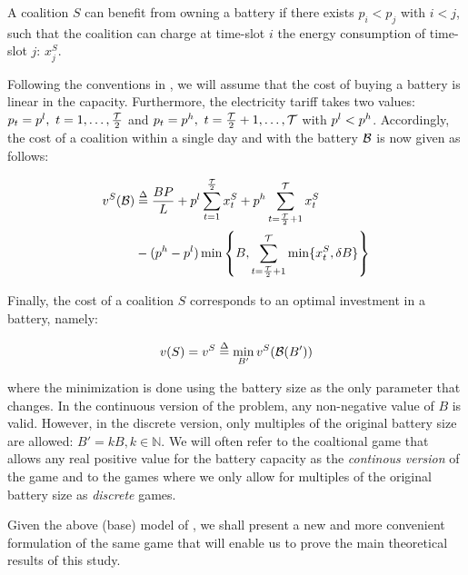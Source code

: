 A coalition $S$ can benefit from owning a battery if there exists $p_i < p_j$ with $i < j$, such that the coalition can charge at time-slot $i$ the energy consumption of time-slot $j$: $x^S_j$.

Following the conventions in \cite{kiedanskigames}, we will assume that the cost of buying a battery is linear in the capacity. Furthermore, the electricity tariff takes two values: $p_t = \pricelow, \ t=1, \dots, \frac{\mathcal{T}}{2}$ and $p_t = p^h, \ t=\frac{\mathcal{T}}{2} + 1, \dots, \mathcal{T}$ with $p^l < p^h$.
Accordingly, the cost of a coalition within a single day and with the battery $\mathcal{B}$ is now given as follows:

\begin{equation}
  \begin{aligned}
  \label{eq:cost_coal_bat}
  v^S(\Bat) &\overset{\Delta}{=} \frac{BP}{L} + p^l\sum_{t=1}^{\frac{\mathcal{T}}{2}} x^S_t
  + p^ h\sum_{t=\frac{\mathcal{T}}{2} + 1}^{\mathcal{{T}}} x^S_t \\
  &- (p^h -p^l)\min\left\{ B, \sum_{t=\frac{\mathcal{T}}{2} + 1}^{\mathcal{{T}}} \min\{x^S_t, \delta B\} \right\} \\
  \end{aligned}
\end{equation}


Finally, the cost of a coalition $S$ corresponds to an optimal investment in a battery, namely:

\begin{equation}
  \label{eq:cost_coal}
  v(S) = v^S \overset{\Delta}{=} \min_{B'} v^S(\Bat(B'))
\end{equation}

where the minimization is done using the battery size as the only parameter that changes. In the continuous version of the problem, any non-negative value of $B$ is valid. However, in the discrete version, only multiples of the original battery size are allowed: $B' = kB, k \in \mathbb{N}$. We will often refer to the coaltional game that allows any real positive value for the battery capacity as the \textit{continous version} of the game and to the games where we only allow for multiples of the original battery size as \textit{discrete} games.

Given the above (base) model of \cite{kiedanskigames}, we shall present a new and more convenient formulation of the same game that will enable us to prove the main theoretical results of this study.


